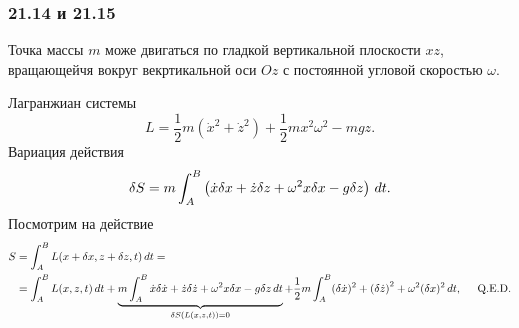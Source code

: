 \subsubsection*{21.14 и 21.15}

Точка массы $m$ може двигаться по гладкой вертикальной плоскости $xz$, вращающейчя вокруг векртикальной оси $Oz$ с постоянной угловой скоростью $\omega$. 

Лагранжиан системы
\begin{equation}
    L = \frac{1}{2} m \left(
        \dot{x}^2 + \dot{z}^2
    \right) + 
    \frac{1}{2} m x^2 \omega^2
    - mgz.
\end{equation}
Вариация действия
\begin{equation*}
    \delta S = m \int_{A}^{B} \left(
        \dot{x} \delta x + \dot{z} \delta z + \omega^2 x \delta x - g \delta z
    \right) \, d t.
\end{equation*}
Посмотрим на действие
\begin{align*}
    S 
    &= \int_{A}^{B} 
    L(x+\delta x, z + \delta z, t) \, d t = \\
    &= \int_{A}^{B}
    L(x, z, t) \, d t + 
    \underbrace{
    m \int_{A}^{B} \dot{x} \delta \dot{x} + \dot{z} \delta \dot{z} + \omega^2 x \delta x - g \delta z \, d t
    }_{\delta S (L(x, z, t)) = 0} +
    \frac{1}{2} m \int_{A}^{B}
     (\delta \dot{x})^2 + \left(\delta \dot{z}\right)^2 + \omega^2
     (\delta x)^2 \, d t, \hspace{0.5cm} \text{Q.E.D.}
\end{align*}
